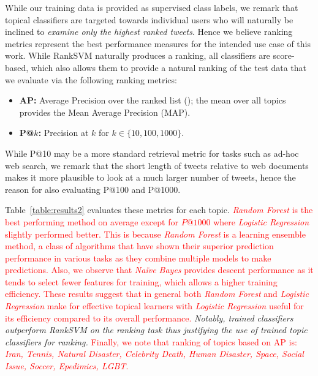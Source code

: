 While our training data
is provided as supervised class labels, we remark that topical classifiers
are targeted towards individual users who will naturally be inclined 
to \emph{examine only the highest ranked tweets}.  Hence we believe ranking
metrics represent the best performance measures for the intended use case of this work.
While RankSVM naturally produces a ranking, all classifiers are score-based, which also allows
them to provide a natural ranking of the test data that we evaluate via the following
ranking metrics:
\begin{itemize}
\item {\bf AP:} Average Precision over the ranked list (\cite{manning_ir}); the mean over
all topics provides the Mean Average Precision (MAP).
\item {\bf P@$k$:} Precision at $k$ for $k \in \{ 10, 100, 1000 \}$.
\end{itemize}
While P@10 may be a more standard retrieval metric for tasks such
as ad-hoc web search, we remark that the short length of tweets relative
to web documents makes it more plausible to look at a much larger number
of tweets, hence the reason for also evaluating P@100 and P@1000.


Table~\ref{table:results2} evaluates these metrics for each topic.
\textcolor{red}{\textit{Random Forest} is the best performing method on average except for $P@1000$ where \textit{Logistic Regression} slightly performed better. This is because \textit{Random Forest} is a learning ensemble method, a class of algorithms that have shown their superior prediction performance in various tasks as they combine multiple models to make predictions.
Also, we observe that \textit{Na\"{i}ve Bayes} provides descent performance as it tends to select fewer features for training, which allows a higher training efficiency.
These results suggest that in general both \textit{Random Forest} and \textit{Logistic Regression}
 make for effective topical 
learners with \textit{Logistic Regression} useful for 
its efficiency compared to its overall performance.}  \emph{Notably,
trained classifiers outperform RankSVM on the ranking task thus justifying the use of trained topic classifiers for ranking.} \textcolor{red}{Finally, we note that ranking of topics based on AP is:  \emph{Iran, Tennis, Natural Disaster, Celebrity Death, Human Disaster, Space, Social Issue, Soccer, Epedimics, LGBT}.}

